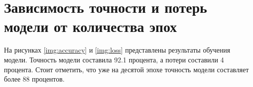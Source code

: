 
\section{Зависимость точности и потерь модели от количества эпох}

На рисунках \ref*{img:accuracy} и \ref*{img:loss} представлены результаты обучения модели. Точность модели составила 92.1 процента, а потери составили 4 процента. Стоит
отметить, что уже на десятой эпохе точность модели составляет более 88 процентов.

